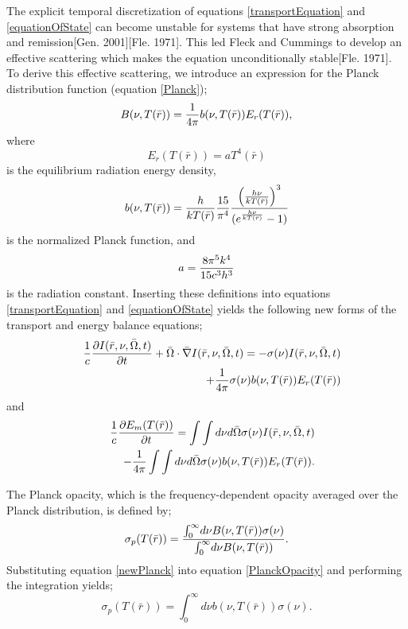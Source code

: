 \noindent
	\indent The explicit temporal discretization of equations \ref{transportEquation} and \ref{equationOfState} can become unstable for systems that have strong absorption and remission[Gen. 2001][Fle. 1971]. This led Fleck and Cummings to develop an effective scattering which makes the equation unconditionally stable[Fle. 1971]. To derive this effective scattering, we introduce an expression for the Planck distribution function (equation \ref{Planck}); 
	\begin{equation}
	\label{newPlanck}
	{B(\nu,T(\bar{r}))}={1\over{4\pi}}b(\nu,T(\bar{r}))E_r(T(\bar{r})),
	\end{equation}
	where	
	\begin{equation}
	\label{radiationEnergyDensity}
	{E_r(T(\bar{r}))}=aT^4(\bar{r}) \nonumber
	\end{equation}
	is the equilibrium radiation energy density,
	\begin{equation}
	\label{normalizedPlanck}
	{b(\nu,T(\bar{r}))}={h\over{kT(\bar{r})}}{15\over{\pi^4}}{\left({h\nu\over{kT(\bar{r})}}\right)^3\over{(e^{h\nu\over{kT(\bar{r})}}}-1)} 
	\end{equation}
	is the normalized Planck function, and
	\begin{equation}
	\label{radiationConstant}
	{a}={8\pi^{5}k^{4}\over{15c^{3}h^{3}}} \nonumber
	\end{equation}
	is the radiation constant. Inserting these definitions into equations \ref{transportEquation} and \ref{equationOfState} yields the following new forms of the transport and energy balance equations;
	\begin{eqnarray}
	\label{Fleck1}
	&&{1\over{c}}{\partial{I(\bar{r},\nu,\bar{\Omega},t)}\over{\partial{t}}}+\bar{\Omega}\cdot\bar{\nabla}{I(\bar{r},\nu,\bar{\Omega},t)}=-\sigma(\nu)I(\bar{r},\nu,\bar{\Omega},t)\nonumber \\&&
	+{1\over{4\pi}}\sigma(\nu){b(\nu,T(\bar{r}))E_r(T(\bar{r}))}
	\end{eqnarray}
	and
	\begin{eqnarray}
	\label{Fleck2}
	&&{1\over{c}}{\partial{E_m(T(\bar{r}))}\over{\partial{t}}}={\int\int{d\nu}{d\bar{\Omega}}\sigma(\nu)I(\bar{r},\nu,\bar{\Omega},t)}\nonumber \\&&
	-{{1\over{4\pi}}\int\int{d\nu d\bar{\Omega}}{\sigma(\nu)b(\nu,T(\bar{r})){E_r(T(\bar{r}))}}}.
	\end{eqnarray}

	The Planck opacity, which is the frequency-dependent opacity averaged over the Planck distribution, is defined by;
	\begin{equation}
	\label{PlanckOpacity}
	{\sigma_p(T(\bar{r}))}={{\int^\infty_0}d\nu B(\nu,T(\bar{r}))\sigma(\nu)\over{\int^\infty_0}d\nu{B(\nu,T(\bar{r}))}}.
	\end{equation}
	Substituting equation \ref{newPlanck} into equation \ref{PlanckOpacity} and performing the integration yields;
	\begin{equation}
	\label{PlanckOpacity2}
	{\sigma_p(T(\bar{r}))}={{\int^\infty_0}d\nu b(\nu,T(\bar{r}))\sigma(\nu)}.
	\end{equation}
	
